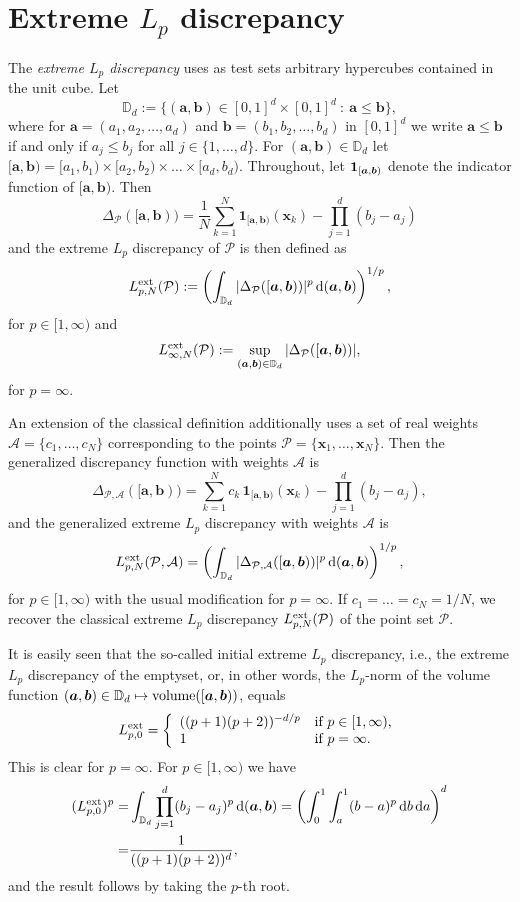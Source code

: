 \documentclass[12pt]{article}
\theoremstyle{remark}
\theoremstyle{definition}
\newcommand{\D}{\mathbb{D}}
\newcommand{\ex}{{\rm ext}}
\newcommand{\rd}{\,{\rm d}}
\newcommand{\bsx}{{\boldsymbol x}}
\newcommand{\bsa}{{\boldsymbol a}}
\newcommand{\bsb}{{\boldsymbol b}}
\newcommand{\cP}{\mathcal{P}}
\newcommand{\cA}{\mathcal{A}}
\newcommand{\<}{\langle}
\renewcommand{\>}{\rangle}
\begin{document}
\section{Extreme $L_p$ discrepancy} \label{sec:disc}

The {\it extreme $L_p$ discrepancy} uses as test sets arbitrary hypercubes contained in the unit cube. Let $$\D_d:=\{(\bsa,\bsb) \in [0,1]^d \times [0,1]^d \ : \ \bsa \le \bsb\},$$ where for $\bsa=(a_1,a_2,\ldots,a_d)$ and $\bsb=(b_1,b_2,\ldots,b_d)$ in $[0,1]^d$ we write $\bsa \leq \bsb$ if and only if $a_j \le b_j$ for all $j \in \{1,\ldots,d\}$. For $(\bsa,\bsb) \in \D_d$ let $[\bsa,\bsb)=[a_1,b_1)\times [a_2,b_2) \times \ldots \times [a_d,b_d)$.  Throughout, let ${\bf 1}_{[\bsa,\bsb)}$ denote the indicator function of $[\bsa,\bsb)$. Then
$$\Delta_{\cP}([\bsa,\bsb))=\frac{1}{N} \sum_{k=1}^N \mathbf{1}_{[\bsa,\bsb)}(\bsx_k) - \prod_{j=1}^d (b_j-a_j)$$ and
the extreme $L_p$ discrepancy of $\cP$ is then defined as
$$L_{p,N}^{\ex}(\cP):=\left(\int_{\D_d} |\Delta_{\cP}([\bsa,\bsb))|^p\rd (\bsa,\bsb)\right)^{1/p},$$ for $p \in [1,\infty)$ and
$$L_{\infty,N}^{\ex}(\cP):=\sup_{(\bsa,\bsb) \in \D_d}  |\Delta_{\cP}([\bsa,\bsb))|,$$ for $p =\infty$.

An extension of the classical definition additionally uses a set of real weights $\cA=\{c_1,\ldots,c_N\}$ corresponding 
to the points $\cP=\{\bsx_1,\ldots,\bsx_N\}$. Then the generalized discrepancy function with weights $\cA$ is
\[
\Delta_{\cP,\cA}([\bsa,\bsb))
   = \sum_{k=1}^N c_k\,\mathbf{1}_{[\bsa,\bsb)}(\bsx_k) 
     - \prod_{j=1}^d (b_j-a_j),
\]
and the generalized extreme $L_p$ discrepancy with weights $\cA$ is 
\[
L_{p,N}^{\ex}(\cP,\cA)
  = \left(\int_{\D_d}
        |\Delta_{\cP,\cA}([\bsa,\bsb))|^p \rd(\bsa,\bsb) \right)^{1/p},
\]
for $p\in[1,\infty)$ with the usual modification for $p=\infty$. 
If $c_1=\dots=c_N=1/N$, we recover the classical extreme $L_p$ discrepancy $L_{p,N}^{\ex}(\cP)$ of the point set $\cP$.

It is easily seen that the so-called initial extreme $L_p$ discrepancy, i.e., the extreme $L_p$ discrepancy of the emptyset, or, in other words, the $L_p$-norm of the volume function $(\bsa,\bsb) \in \D_d \mapsto {\rm volume}([\bsa,\bsb))$, equals $$L_{p,0}^{\ex}=\left\{ 
\begin{array}{ll}
((p+1)(p+2))^{-d/p} & \mbox{if $p \in [1,\infty)$,}\\
1 & \mbox{if $p=\infty$.} 
\end{array}
\right.$$
This is clear for $p=\infty$. For $p \in [1,\infty)$ we have
\begin{align*}
(L_{p,0}^{\ex})^p = & \int_{\D_d} \prod_{j=1}^d (b_j-a_j)^p \rd (\bsa,\bsb) 
= \left(\int_0^1 \int_a^1 (b-a)^p \rd b \rd a \right)^d\\
= & \frac{1}{((p+1)(p+2))^d},
\end{align*}
and the result follows by taking the $p$-th root.
\end{document}
